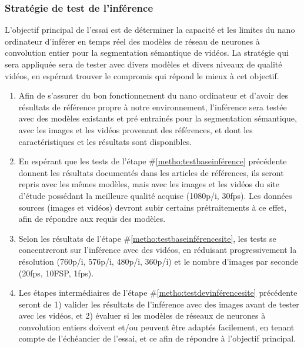 \subsubsection{Stratégie de test de l'inférence} \label{section:strategie_test_inference}
\noindent L'objectif principal de l'essai est de déterminer la capacité et les limites du nano ordinateur d'inférer en temps réel des modèles de réseau de neurones à convolution entier pour la segmentation sémantique de vidéos. La stratégie qui sera appliquée sera de tester avec divers modèles et divers niveaux de qualité vidéos, en espérant trouver le compromis qui répond le mieux à cet objectif.
\begin{enumerate}
   \item \label{metho:testbaseinférence} Afin de s'assurer du bon fonctionnement du nano ordinateur et d'avoir des résultats de référence propre à notre environnement, l'inférence sera testée avec des modèles existants et pré entrainés pour la segmentation sémantique, avec les images et les vidéos provenant des références, et dont les caractéristiques et les résultats sont disponibles. 
   \item \label{metho:testbaseinférencesite} En espérant que les tests de l'étape \#\ref{metho:testbaseinférence} précédente donnent les résultats documentés dans les articles de références, ils seront repris avec les mêmes modèles, mais avec les images et les vidéos du site d'étude possédant la meilleure qualité acquise (1080p/i, 30\acrshort{fps}). Les données sources (images et vidéos) devront subir certains prétraitements à ce effet, afin de répondre aux requis des modèles.
   \item \label{metho:testdevinférencesite} Selon les résultats de l'étape \#\ref{metho:testbaseinférencesite}, les tests se concentreront sur l'inférence avec des vidéos, en réduisant progressivement la résolution (760p/i, 576p/i, 480p/i, 360p/i) et le nombre d'images par seconde (20\acrshort{fps}, 10FSP, 1\acrshort{fps}).
   \item Les étapes intermédiaires de l'étape \#\ref{metho:testdevinférencesite} précédente seront de 1) valider les résultats de l'inférence avec des images avant de tester avec les vidéos, et 2) évaluer si les modèles de réseaux de neurones à convolution entiers doivent et/ou peuvent être adaptés facilement, en tenant compte de l'échéancier de l'essai, et ce afin de répondre à l'objectif principal.
\end{enumerate}
